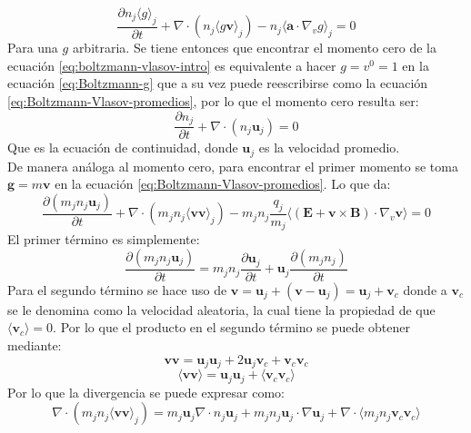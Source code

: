 \documentclass[../tesis_main_file.tex]{subfiles}
\begin{document}
\begin{equation}
\label{eq:Boltzmann-Vlasov-promedios}
\frac{\partial n_j \langle g \rangle_j}{\partial t}+\nabla \cdot (n_j \langle g \textbf{v} \rangle_j)-n_j \langle \textbf{a}\cdot \nabla_v g \rangle_j=0
\end{equation}
Para una $g$ arbitraria. Se tiene entonces que encontrar el momento cero de la ecuación \ref{eq:boltzmann-vlasov-intro} es equivalente a hacer $g=v^0=1$ en la ecuación \ref{eq:Boltzmann-g} que a su vez puede reescribirse como la ecuación \ref{eq:Boltzmann-Vlasov-promedios}, por lo que el momento cero resulta ser:
\begin{equation}
\frac{\partial n_j}{\partial t}+\nabla \cdot (n_j \textbf{u}_j)=0
\end{equation}
Que es la ecuación de continuidad, donde $\textbf{u}_j$ es la velocidad promedio.\\
De manera análoga al momento cero, para encontrar el primer momento se toma $\textbf{g}=m\textbf{v}$ en la ecuación \ref{eq:Boltzmann-Vlasov-promedios}. Lo que da:
\begin{equation}
\frac{\partial (m_jn_j\textbf{u}_j)}{\partial t}+\nabla \cdot (m_jn_j\langle \textbf{v}\textbf{v} \rangle_j)-m_jn_j\frac{q_j}{m_j}\langle (\textbf{E}+\textbf{v}\times \textbf{B})\cdot \nabla_v\textbf{v}\rangle=0
\end{equation}
El primer término es simplemente:
\begin{equation}
\frac{\partial (m_jn_j\textbf{u}_j)}{\partial t}= m_jn_j\frac{\partial \textbf{u}_j}{\partial t}+ \textbf{u}_j\frac{\partial (m_jn_j)}{\partial t}
\end{equation}
Para el segundo término se hace uso de $\textbf{v}=\textbf{u}_j+(\textbf{v}-\textbf{u}_j)=\textbf{u}_j+\textbf{v}_c$ donde a $\textbf{v}_c$ se le denomina como la velocidad aleatoria, la cual tiene la propiedad de que $\langle \textbf{v}_c \rangle=0$.
Por lo que el producto en el segundo término se puede obtener mediante:
\begin{equation}
\textbf{v}\textbf{v}=\textbf{u}_j \textbf{u}_j + 2\textbf{u}_j \textbf{v}_c + \textbf{v}_c \textbf{v}_c
\end{equation}
\begin{equation}
\langle \textbf{v} \textbf{v} \rangle = \textbf{u}_j \textbf{u}_j +\langle \textbf{v}_c \textbf{v}_c \rangle
\end{equation}
Por lo que la divergencia se puede expresar como:
\begin{equation}
\nabla \cdot (m_jn_j\langle \textbf{v}\textbf{v} \rangle_j)=m_j \textbf{u}_j\nabla \cdot n_j \textbf{u}_j+m_jn_j\textbf{u}_j\cdot \nabla \textbf{u}_j+\nabla \cdot \langle m_jn_j \textbf{v}_c \textbf{v}_c \rangle
\end{equation}
\end{document}
